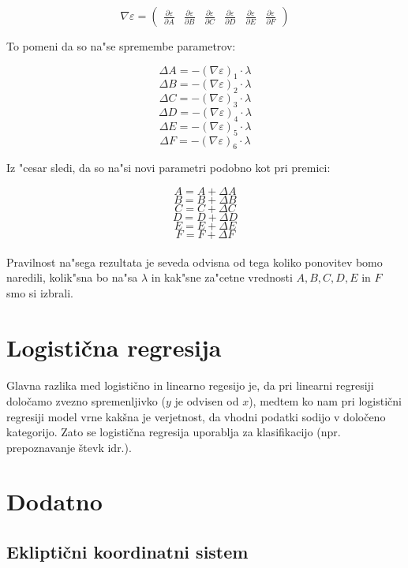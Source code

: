 \documentclass[a4paper, 12pt]{article}
\begin{document}
	$$\nabla \varepsilon = \begin{pmatrix}
	\frac{\partial \varepsilon}{\partial A} &
	\frac{\partial \varepsilon}{\partial B} &
	\frac{\partial \varepsilon}{\partial C} &
	\frac{\partial \varepsilon}{\partial D} &
	\frac{\partial \varepsilon}{\partial E} &
	\frac{\partial \varepsilon}{\partial F}
 	\end{pmatrix}$$
	
	To pomeni da so na"se spremembe parametrov:
	
	$$\Delta A = -(\nabla \varepsilon)_1 \cdot \lambda$$
	$$\Delta B = -(\nabla \varepsilon)_2 \cdot \lambda$$
	$$\Delta C = -(\nabla \varepsilon)_3 \cdot \lambda$$
	$$\Delta D = -(\nabla \varepsilon)_4 \cdot \lambda$$
	$$\Delta E = -(\nabla \varepsilon)_5 \cdot \lambda$$
	$$\Delta F = -(\nabla \varepsilon)_6 \cdot \lambda$$
	
	Iz "cesar sledi, da so na"si novi parametri podobno kot pri premici:
	
	$$A = A + \Delta A$$
	$$B = B + \Delta B$$
	$$C = C + \Delta C$$
	$$D = D + \Delta D$$
	$$E = E + \Delta E$$
	$$F = F + \Delta F$$
	
	\paragraph{}Pravilnost na"sega rezultata je seveda odvisna od tega koliko ponovitev bomo naredili, kolik"sna bo na"sa $\lambda$ in kak"sne za"cetne vrednosti $A, B, C, D, E$ in $F$ smo si izbrali.
	
    \section*{Logistična regresija}
    \paragraph{}
    Glavna razlika med logistično in linearno regesijo je, da pri linearni regresiji določamo zvezno spremenljivko ($y$ je odvisen od $x$), medtem ko nam pri logistični regresiji model vrne kakšna je verjetnost, da vhodni podatki sodijo v določeno kategorijo.
    Zato se logistična regresija uporablja za klasifikacijo (npr. prepoznavanje števk idr.).


    \section*{Dodatno}
    \subsection*{Ekliptični koordinatni sistem}
\end{document}
